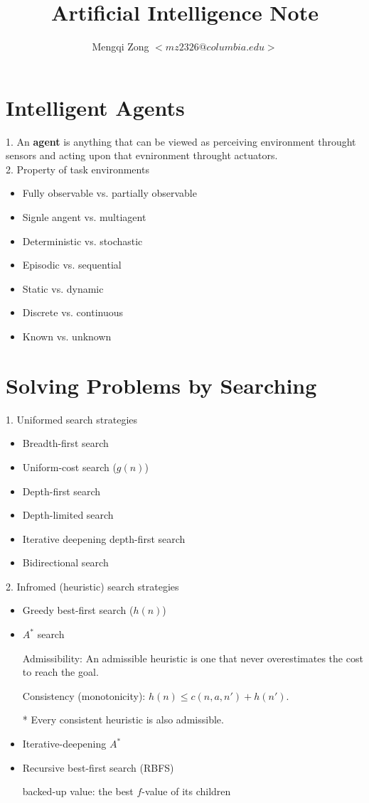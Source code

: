 \documentclass[12pt]{article}
\title{Artificial Intelligence Note}
\author{Mengqi Zong $<mz2326@columbia.edu>$}
\begin{document}
\maketitle

\setlength{\parindent}{0in}

\section*{Intelligent Agents}

1. An {\bf agent} is anything that can be viewed as perceiving environment throught sensors and acting upon that evnironment throught actuators. \\

2. Property of task environments

\begin{itemize}
  \item Fully observable vs. partially observable
  \item Signle angent vs. multiagent
  \item Deterministic vs. stochastic
  \item Episodic vs. sequential
  \item Static vs. dynamic
  \item Discrete vs. continuous
  \item Known vs. unknown
\end{itemize}

\section*{Solving Problems by Searching}

1. Uniformed search strategies

\begin{itemize}
  \item Breadth-first search
  \item Uniform-cost search ($g(n)$)
  \item Depth-first search
  \item Depth-limited search
  \item Iterative deepening depth-first search
  \item Bidirectional search
\end{itemize}

2. Infromed (heuristic) search strategies

\begin{itemize}
  \item Greedy best-first search ($h(n)$)
  \item $A^*$ search

    Admissibility: An admissible heuristic is one that never overestimates the cost to reach the goal.

    Consistency (monotonicity): $h(n) \le c(n,a,n') + h(n')$.

    * Every consistent heuristic is also admissible.
  \item Iterative-deepening $A^*$
  \item Recursive best-first search (RBFS)

    backed-up value: the best $f$-value of its children
\end{itemize}
\end{document}

